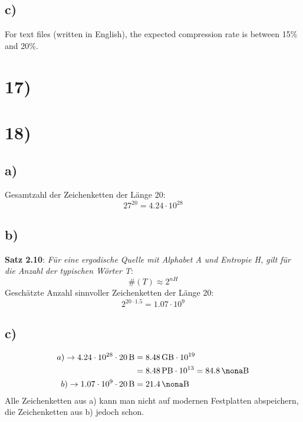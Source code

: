   \subsection*{c)}

  For text files (written in English), the expected compression rate is between 15\% and 20\%.

  \section*{17)}
  \section*{18)}

    \subsection*{a)}

      Gesamtzahl der Zeichenketten der Länge 20:\\
      \[27^{20} = 4.24 \cdot 10^{28} \]

    \subsection*{b)}

      \textbf{Satz 2.10}: \textit{Für eine ergodische Quelle mit Alphabet A und Entropie H, gilt für die Anzahl der typischen Wörter T}:
      \[ \#(T) \approx 2^{nH} \]
      \newline
      Geschätzte Anzahl sinnvoller Zeichenketten der Länge 20:
      \[ 2^{20 \cdot 1.5} = 1.07 \cdot 10^{9} \]

    \subsection*{c)}

      \begin{equation}
      	\begin{split}
      	  a) \rightarrow 4.24 \cdot 10^{28} \cdot \SI{20}{\byte} & = \SI{8.48}{\giga\byte} \cdot 10^{19} \\
      	  & = \SI{8.48}{\peta\byte} \cdot 10^{13} = \SI{84.8}{\nona\byte} \\
      	  b) \rightarrow 1.07 \cdot 10^{9} \cdot \SI{20}{\byte} & = \SI{21.4}{\nona\byte} \\
      	\end{split}
      \end{equation}
      \newline
      Alle Zeichenketten aus a) kann man nicht auf modernen Festplatten abspeichern, die Zeichenketten aus b) jedoch schon.\\

